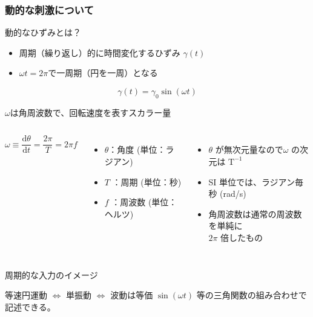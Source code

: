 \documentclass[unicode,12pt,aspectratio=169]{beamer}
\begin{document}
\begin{frame}
	\frametitle{動的な刺激について}
	\begin{block}{動的なひずみとは？}
		\begin{itemize}
			\item 周期（繰り返し）的に時間変化するひずみ $\gamma (t)$
			\item $\omega t = 2\pi$で一周期（円を一周）となる
		\end{itemize}
		\begin{equation*}
			\gamma (t) = \gamma_0 \sin(\omega t)
		\end{equation*}
	\end{block}

	\begin{block}{$\omega$は角周波数で、回転速度を表すスカラー量}
		\begin{columns}[T, onlytextwidth]
			\footnotesize

			\vspace{3mm}
			\begin{equation*}
				\omega \equiv \dfrac{\mathrm{d} \theta}{\mathrm{d} t} = \dfrac{2 \pi}{T} = 2\pi f
			\end{equation*}
			\vspace{-3mm}
			\begin{itemize}
				\item $\theta$：角度 (単位：ラジアン)
				\item $T$ ：周期 (単位：秒)
				\item $f$ ：周波数 (単位：ヘルツ)
			\end{itemize}
			\footnotesize
			\begin{itemize}
				\item $\theta$ が無次元量なので$\omega$ の次元は $\mathrm{T}^{-1}$
				\item SI 単位では、ラジアン毎秒 (rad/s)
				\item 角周波数は通常の周波数を単純に\\$2\pi$ 倍したもの
			\end{itemize}
		\end{columns}
	\end{block}
\end{frame}

\begin{frame}{周期的な入力のイメージ}
	\begin{block}{等速円運動 $\Leftrightarrow$ 単振動 $\Leftrightarrow$ 波動は等価}
		$\sin(\omega t)$ 等の三角関数の組み合わせで記述できる。

		\vspace{1mm}
		\centering
	\end{block}
\end{frame}
\end{document}
